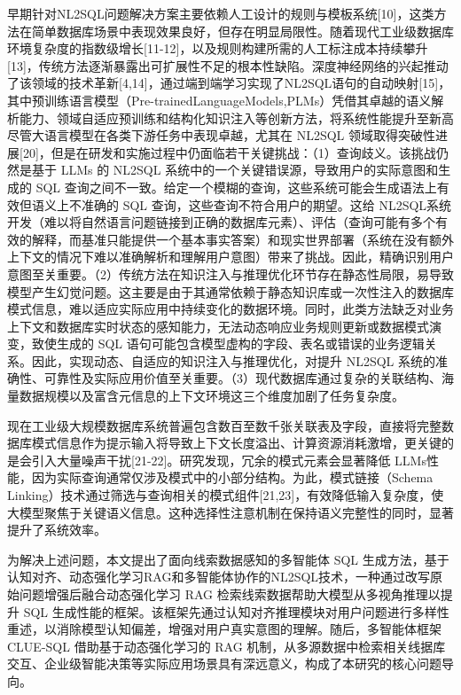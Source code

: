 \documentclass[12pt,a4paper,openright,UTF8]{ctexbook}
\begin{document}
早期针对NL2SQL问题解决方案主要依赖人工设计的规则与模板系统[10]，这类方法在简单数据库场景中表现效果良好，但存在明显局限性。随着现代工业级数据库环境复杂度的指数级增长[11-12]，以及规则构建所需的人工标注成本持续攀升[13]，传统方法逐渐暴露出可扩展性不足的根本性缺陷。深度神经网络的兴起推动了该领域的技术革新[4,14]，通过端到端学习实现了NL2SQL语句的自动映射[15]，其中预训练语言模型（Pre-trainedLanguageModels,PLMs）凭借其卓越的语义解析能力、领域自适应预训练和结构化知识注入等创新方法，将系统性能提升至新高尽管大语言模型在各类下游任务中表现卓越，尤其在 NL2SQL 领域取得突破性进展[20]，但是在研发和实施过程中仍面临若干关键挑战：（1）查询歧义。该挑战仍然是基于 LLMs 的 NL2SQL 系统中的一个关键错误源，导致用户的实际意图和生成的 SQL 查询之间不一致。给定一个模糊的查询，这些系统可能会生成语法上有效但语义上不准确的 SQL 查询，这些查询不符合用户的期望。这给 NL2SQL系统开发（难以将自然语言问题链接到正确的数据库元素）、评估（查询可能有多个有效的解释，而基准只能提供一个基本事实答案）和现实世界部署（系统在没有额外上下文的情况下难以准确解析和理解用户意图）带来了挑战。因此，精确识别用户意图至关重要。（2）传统方法在知识注入与推理优化环节存在静态性局限，易导致模型产生幻觉问题。这主要是由于其通常依赖于静态知识库或一次性注入的数据库模式信息，难以适应实际应用中持续变化的数据环境。同时，此类方法缺乏对业务上下文和数据库实时状态的感知能力，无法动态响应业务规则更新或数据模式演变，致使生成的 SQL 语句可能包含模型虚构的字段、表名或错误的业务逻辑关系。因此，实现动态、自适应的知识注入与推理优化，对提升 NL2SQL 系统的准确性、可靠性及实际应用价值至关重要。（3）现代数据库通过复杂的关联结构、海量数据规模以及富含元信息的上下文环境这三个维度加剧了任务复杂度。


现在工业级大规模数据库系统普遍包含数百至数千张关联表及字段，直接将完整数据库模式信息作为提示输入将导致上下文长度溢出、计算资源消耗激增，更关键的是会引入大量噪声干扰[21-22]。研究发现，冗余的模式元素会显著降低 LLMs性能，因为实际查询通常仅涉及模式中的小部分结构。为此，模式链接（Schema Linking）技术通过筛选与查询相关的模式组件[21,23]，有效降低输入复杂度，使大模型聚焦于关键语义信息。这种选择性注意机制在保持语义完整性的同时，显著提升了系统效率。


为解决上述问题，本文提出了面向线索数据感知的多智能体 SQL 生成方法，基于认知对齐、动态强化学习RAG和多智能体协作的NL2SQL技术，一种通过改写原始问题增强后融合动态强化学习 RAG 检索线索数据帮助大模型从多视角推理以提升 SQL 生成性能的框架。该框架先通过认知对齐推理模块对用户问题进行多样性重述，以消除模型认知偏差，增强对用户真实意图的理解。随后，多智能体框架 CLUE-SQL 借助基于动态强化学习的 RAG 机制，从多源数据中检索相关线据库交互、企业级智能决策等实际应用场景具有深远意义，构成了本研究的核心问题导向。
\end{document}

